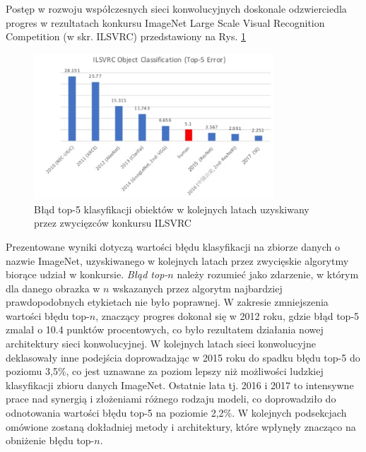 Postęp w rozwoju współczesnych sieci konwolucyjnych doskonale odzwierciedla progres w rezultatach konkursu ImageNet Large Scale Visual Recognition Competition (w skr. ILSVRC) przedstawiony na Rys. \ref{ILSVRC}
\begin{figure}[h!]
	\centering
	\includegraphics[width=0.8\textwidth]{figures/ILSVRC.png}
	\caption{Błąd top-5 klasyfikacji obiektów w kolejnych latach uzyskiwany przez zwycięzców konkursu ILSVRC}
	\label{ILSVRC}
\end{figure}
Prezentowane wyniki dotyczą wartości błędu klasyfikacji na zbiorze danych \cite{imagenet_cvpr09} o nazwie ImageNet, uzyskiwanego w kolejnych latach przez zwycięskie algorytmy biorące udział w konkursie. \textit{Błąd top-$n$} należy rozumieć jako zdarzenie, w którym dla danego obrazka w $n$ wskazanych przez algorytm najbardziej prawdopodobnych etykietach nie było poprawnej. W zakresie zmniejszenia wartości błędu top-$n$, znaczący progres dokonał się w 2012 roku, gdzie błąd top-5 zmalał o 10.4 punktów procentowych, co było rezultatem działania nowej architektury sieci konwolucyjnej. W kolejnych latach sieci konwolucyjne deklasowały inne podejścia doprowadzając w 2015 roku do spadku błędu top-5 do poziomu 3,5\%, co jest uznawane za poziom lepszy niż możliwości ludzkiej klasyfikacji zbioru danych ImageNet. Ostatnie lata tj. 2016 i 2017 to intensywne prace nad synergią i złożeniami różnego rodzaju modeli, co doprowadziło do odnotowania wartości błędu top-5 na poziomie 2,2\%. W kolejnych podsekcjach omówione zostaną dokładniej metody i architektury, które wpłynęły znacząco na obniżenie błędu top-$n$. 

